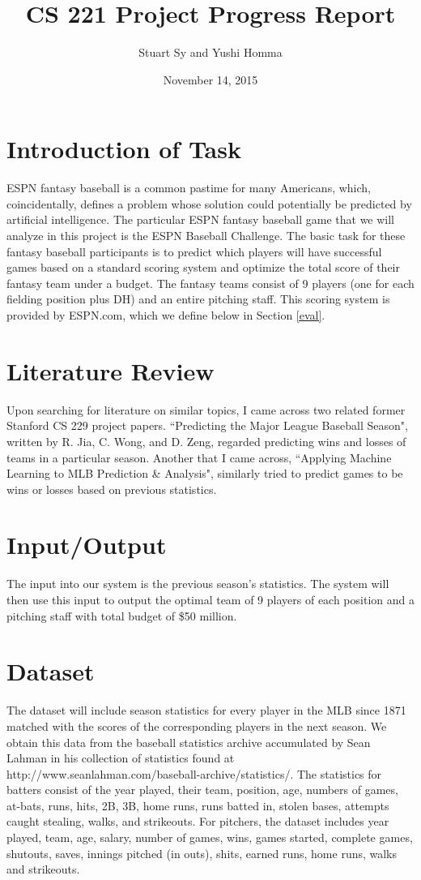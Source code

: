 \documentclass[12pt]{amsart}
\begin{document}
\title{\Large CS 221 Project Progress Report}
\author{Stuart Sy and Yushi Homma}
\date{November 14, 2015}
\maketitle
\section{\large Introduction of Task}
\label{def}
ESPN fantasy baseball is a common pastime for many Americans, which, coincidentally, defines a problem whose solution could potentially be predicted by artificial intelligence. The particular ESPN fantasy baseball game that we will analyze in this project is the ESPN Baseball Challenge. The basic task for these fantasy baseball participants is to predict which players will have successful games based on a standard scoring system and optimize the total score of their fantasy team under a budget. The fantasy teams consist of 9 players (one for each fielding position plus DH) and an entire pitching staff. This scoring system is provided by ESPN.com, which we define below in Section \ref{eval}.

\section{\large Literature Review}
Upon searching for literature on similar topics, I came across two related former Stanford CS 229 project papers. ``Predicting the Major League Baseball Season", written by R. Jia, C. Wong, and D. Zeng, regarded predicting wins and losses of teams in a particular season. Another that I came across, ``Applying Machine Learning to MLB Prediction \& Analysis", similarly tried to predict games to be wins or losses based on previous statistics. 

\section{\large Input/Output}
\label{io}
The input into our system is the previous season's statistics. The system will then use this input to output the optimal team of 9 players of each position and a pitching staff with total budget of \$50 million.

\section{\large Dataset}
The dataset will include season statistics for every player in the MLB since 1871 matched with the scores of the corresponding players in the next season. We obtain this data from the baseball statistics archive accumulated by Sean Lahman in his collection of statistics found at http://www.seanlahman.com/baseball-archive/statistics/. The statistics for batters consist of the year played, their team, position, age, numbers of games, at-bats, runs, hits, 2B, 3B, home runs, runs batted in, stolen bases, attempts caught stealing, walks, and strikeouts. For pitchers, the dataset includes year played, team, age, salary, number of games, wins, games started, complete games, shutouts, saves, innings pitched (in outs), shits, earned runs, home runs, walks and strikeouts.
\end{document}
